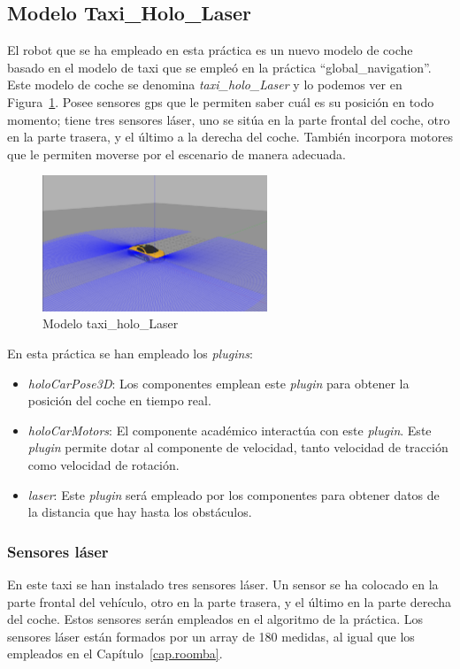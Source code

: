\subsection{Modelo Taxi\_Holo\_Laser}
El robot que se ha empleado en esta práctica es un nuevo modelo de coche basado en el modelo de taxi que se empleó en la práctica ``global\_navigation''. Este modelo de coche se denomina \textit{taxi\_holo\_Laser} y lo podemos ver en Figura~\ref{fig.taxiAutopark}. Posee sensores \acrshort{gps} que le permiten saber cuál es su posición en todo momento; tiene tres sensores láser, uno se sitúa en la parte frontal del coche, otro en la parte trasera, y el último a la derecha del coche. También incorpora motores que le permiten moverse por el escenario de manera adecuada.

\begin{figure}[H]
  \begin{center}
    \includegraphics[width=0.6\textwidth]{figures/Autopark/taxiAutopark.png}
		\caption{Modelo taxi\_holo\_Laser}
		\label{fig.taxiAutopark}
		\end{center}
\end{figure}

En esta práctica se han empleado los \textit{plugins}:

\begin{itemize}
\item \textit{holoCarPose3D}: Los componentes emplean este \textit{plugin} para obtener la posición del coche en tiempo real. 
\item	\textit{holoCarMotors}: El componente académico interactúa con este \textit{plugin}. Este \textit{plugin} permite dotar al componente de velocidad, tanto velocidad de tracción como velocidad de rotación.
\item	\textit{laser}: Este \textit{plugin} será empleado por los componentes para obtener datos de la distancia que hay hasta los obstáculos.
\end{itemize}

\subsubsection{Sensores láser}
En este taxi se han instalado tres sensores láser. Un sensor se ha colocado en la parte frontal del vehículo, otro en la parte trasera, y el último en la parte derecha del coche. Estos sensores serán empleados en el algoritmo de la práctica. Los sensores láser están formados por un array de 180 medidas, al igual que los empleados en el Capítulo~\ref{cap.roomba}. \\


